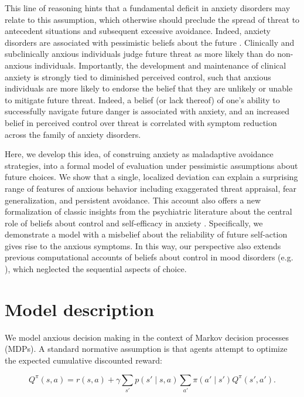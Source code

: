 \documentclass[11pt]{article} %
\begin{document}
This line of reasoning hints that a fundamental deficit in anxiety disorders may relate to this assumption, which otherwise should preclude the spread of threat to antecedent situations and subsequent excessive avoidance. Indeed, anxiety disorders are associated with pessimistic beliefs about the future \citep{ClarkBeck2011}. Clinically and subclinically anxious individuals judge future threat as more likely than do non-anxious individuals\citep{ButlerMathews1983, ButlerMathews1987, MacleodByrne1996}. Importantly, the development and maintenance of clinical anxiety is strongly tied to diminished perceived control\citep{bandura1977, barlow2002, gallagher2014a}, such that anxious individuals are more likely to endorse the belief that they are unlikely or unable to mitigate future threat. Indeed, a belief (or lack thereof) of one's ability to successfully navigate future danger is associated with anxiety\citep{davey1996, dugas1997}, and an increased belief in perceived control over threat is correlated with symptom reduction across the family of anxiety disorders\citep{gallagher2014b}. 

Here, we develop this idea, of construing anxiety as maladaptive avoidance strategies, into a formal model of evaluation under pessimistic assumptions about future choices. We show that a single, localized deviation can explain a surprising range of features of anxious behavior including exaggerated threat appraisal, fear generalization, and persistent avoidance. This account also offers a new formalization of classic insights from the psychiatric literature about the central role of beliefs about control and self-efficacy in anxiety \citep{bandura1977, barlow2002}. Specifically, we demonstrate a model with a misbelief about the reliability of future self-action gives rise to the anxious symptoms. In this way, our perspective also extends previous computational accounts of beliefs about control in mood disorders (e.g. \cite{HuysDayan2009}), which neglected the sequential aspects of choice.

\section{Model description}

We model anxious decision making in the context of Markov decision processes (MDPs). A standard normative assumption is that agents attempt to optimize the expected cumulative discounted reward:

\begin{equation*}
Q^\pi(s,a) = r(s,a) + \gamma \sum_{s'} p(s' \mid s,a) \sum_{a'} \pi(a' \mid s') Q^\pi(s',a').
\end{equation*}
\end{document}

